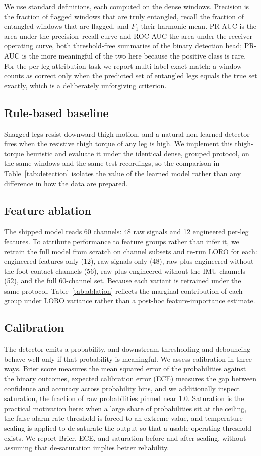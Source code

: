 \documentclass[conference]{IEEEtran}
\begin{document}
We use standard definitions, each computed on the dense windows. Precision is the fraction of flagged windows that are truly entangled, recall the fraction of entangled windows that are flagged, and $F_1$ their harmonic mean. PR-AUC is the area under the precision--recall curve and ROC-AUC the area under the receiver-operating curve, both threshold-free summaries of the binary detection head; PR-AUC is the more meaningful of the two here because the positive class is rare. For the per-leg attribution task we report multi-label exact-match: a window counts as correct only when the predicted set of entangled legs equals the true set exactly, which is a deliberately unforgiving criterion.

\subsection{Rule-based baseline}
Snagged legs resist downward thigh motion, and a natural non-learned detector fires when the resistive thigh torque of any leg is high. We implement this thigh-torque heuristic and evaluate it under the identical dense, grouped protocol, on the same windows and the same test recordings, so the comparison in Table~\ref{tab:detection} isolates the value of the learned model rather than any difference in how the data are prepared.

\subsection{Feature ablation}
The shipped model reads 60 channels: 48 raw signals and 12 engineered per-leg features. To attribute performance to feature groups rather than infer it, we retrain the full model from scratch on channel subsets and re-run LORO for each: engineered features only (12), raw signals only (48), raw plus engineered without the foot-contact channels (56), raw plus engineered without the IMU channels (52), and the full 60-channel set. Because each variant is retrained under the same protocol, Table~\ref{tab:ablation} reflects the marginal contribution of each group under LORO variance rather than a post-hoc feature-importance estimate.

\subsection{Calibration}
The detector emits a probability, and downstream thresholding and debouncing behave well only if that probability is meaningful. We assess calibration in three ways. Brier score measures the mean squared error of the probabilities against the binary outcomes, expected calibration error (ECE) measures the gap between confidence and accuracy across probability bins, and we additionally inspect saturation, the fraction of raw probabilities pinned near 1.0. Saturation is the practical motivation here: when a large share of probabilities sit at the ceiling, the false-alarm-rate threshold is forced to an extreme value, and temperature scaling \cite{guo2017calibration,niculescu2005predicting} is applied to de-saturate the output so that a usable operating threshold exists. We report Brier, ECE, and saturation before and after scaling, without assuming that de-saturation implies better reliability.
\end{document}
